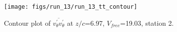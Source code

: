 \begin{figure}[H]
\centering
\texttt{[image: figs/run\_13/run\_13\_tt\_contour]}
\caption{Contour plot of $\overline{v_{\theta}^{\prime} v_{\theta}^{\prime}}$ at $z/c$=6.97, $V_{free}$=19.03, station 2.}
\label{fig:run_13_tt_contour}
\end{figure}


